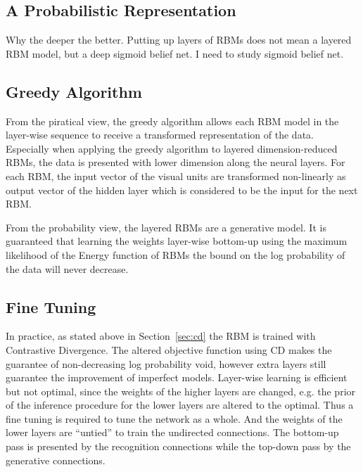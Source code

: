 	\subsection{A Probabilistic Representation}
		Why the deeper the better.
	 	Putting up layers of RBMs does not mean a layered RBM model, but a deep sigmoid belief net.
	 	I need to study sigmoid belief net.
	\subsection{Greedy Algorithm}
		From the piratical view, the greedy algorithm allows each RBM model in the layer-wise sequence to receive a transformed representation of the data.
		Especially when applying the greedy algorithm to layered dimension-reduced RBMs, the data is presented with lower dimension along the neural layers.
		For each RBM, the input vector of the visual units are transformed non-linearly as output vector of the hidden layer which is considered to be the input for the next RBM.
		
		From the probability view, the layered RBMs are a generative model.
		It is guaranteed that learning the weights layer-wise bottom-up using the maximum likelihood of the Energy function of RBMs the bound on the log probability of the data will never decrease. 
	\subsection{Fine Tuning}
		In practice, as stated above in Section~\ref{sec:cd} the RBM is trained with Contrastive Divergence.
			The altered objective function using CD makes the guarantee of non-decreasing log probability void, however extra layers still guarantee the improvement of imperfect models.
		Layer-wise learning is efficient but not optimal, since the weights of the higher layers are changed, e.g. the prior of the inference procedure for the lower layers are altered to the optimal.
		Thus a fine tuning is required to tune the network as a whole.
		And the weights of the lower layers are ``untied'' to train the undirected connections.
		The bottom-up pass is presented by the recognition connections while the top-down pass by the generative connections.
		
